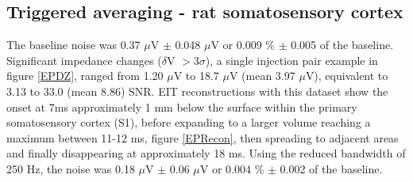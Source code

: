 \subsection{Triggered averaging - rat somatosensory cortex}
The baseline noise was 0.37 $\mu$V $\pm$ 0.048 $\mu$V or 0.009 \% $\pm$ 0.005 of the baseline. Significant impedance changes ($\delta$V $> 3\sigma$), a single injection pair example in figure \ref{EPDZ}, ranged from 1.20 $\mu$V to 18.7 $\mu$V (mean 3.97 $\mu$V), equivalent to 3.13 to 33.0 (mean 8.86) SNR. EIT reconstructions with this dataset show the onset at 7ms approximately 1 mm below the surface within the primary somatosensory cortex (S1), before expanding to a larger volume reaching a maximum between 11-12 ms, figure \ref{EPRecon}, then spreading to adjacent areas and finally disappearing at approximately 18 ms. Using the reduced bandwidth of 250 Hz, the noise was 0.18 $\mu$V $\pm$ 0.06 $\mu$V or 0.004 \% $\pm$ 0.002 of the baseline.
